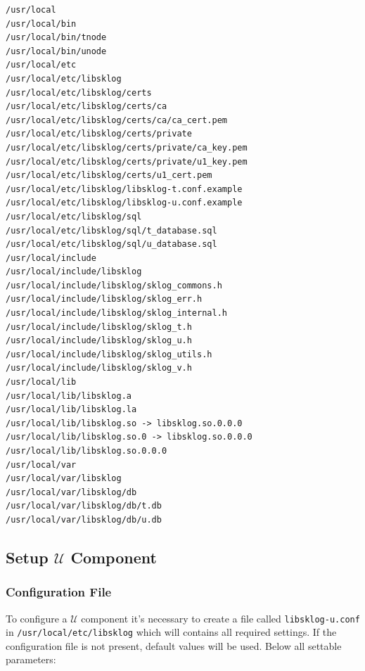 \documentclass[a4paper,12pt]{article}
\def\u{$\mathcal{U}$\xspace}
\begin{document}
\begin{lstlisting}
/usr/local
/usr/local/bin
/usr/local/bin/tnode
/usr/local/bin/unode
/usr/local/etc
/usr/local/etc/libsklog
/usr/local/etc/libsklog/certs
/usr/local/etc/libsklog/certs/ca
/usr/local/etc/libsklog/certs/ca/ca_cert.pem
/usr/local/etc/libsklog/certs/private
/usr/local/etc/libsklog/certs/private/ca_key.pem
/usr/local/etc/libsklog/certs/private/u1_key.pem
/usr/local/etc/libsklog/certs/u1_cert.pem
/usr/local/etc/libsklog/libsklog-t.conf.example
/usr/local/etc/libsklog/libsklog-u.conf.example
/usr/local/etc/libsklog/sql
/usr/local/etc/libsklog/sql/t_database.sql
/usr/local/etc/libsklog/sql/u_database.sql
/usr/local/include
/usr/local/include/libsklog
/usr/local/include/libsklog/sklog_commons.h
/usr/local/include/libsklog/sklog_err.h
/usr/local/include/libsklog/sklog_internal.h
/usr/local/include/libsklog/sklog_t.h
/usr/local/include/libsklog/sklog_u.h
/usr/local/include/libsklog/sklog_utils.h
/usr/local/include/libsklog/sklog_v.h
/usr/local/lib
/usr/local/lib/libsklog.a
/usr/local/lib/libsklog.la
/usr/local/lib/libsklog.so -> libsklog.so.0.0.0
/usr/local/lib/libsklog.so.0 -> libsklog.so.0.0.0
/usr/local/lib/libsklog.so.0.0.0
/usr/local/var
/usr/local/var/libsklog
/usr/local/var/libsklog/db
/usr/local/var/libsklog/db/t.db
/usr/local/var/libsklog/db/u.db
\end{lstlisting}



\subsection{Setup $\mathcal{U}$ Component}

\subsubsection{Configuration File}

To configure a \u component it's necessary to create a file called
\texttt{libsklog-u.conf} in \texttt{/usr/local/etc/libsklog} which
will contains all required settings. If the configuration file is
not present, default values will be used. Below all settable
parameters:
\end{document}
